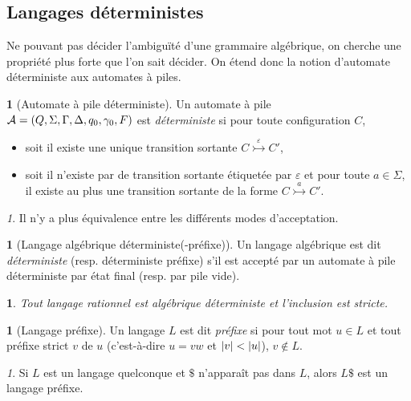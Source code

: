 \documentclass[10pt,a4paper,notitlepage]{article}
\theoremstyle{plain}
\theoremstyle{definition}
\newtheorem{defn}[thm]{\protect\definitionname}
\theoremstyle{definition}
\theoremstyle{remark}
\theoremstyle{remark}
\newtheorem{rem}[thm]{\protect\remarkname}
\theoremstyle{plain}
\theoremstyle{plain}
\newtheorem{prop}[thm]{\protect\propositionname}
\theoremstyle{plain}
\theoremstyle{remark}
\providecommand{\definitionname}{Définition}
\providecommand{\propositionname}{Proposition}
\providecommand{\remarkname}{Remarque}
\begin{document}
\subsection{Langages déterministes} %

Ne pouvant pas décider l'ambiguïté d'une grammaire algébrique, on cherche une propriété plus forte que l'on sait décider. On étend donc la notion d'automate déterministe aux automates à piles.

\begin{defn}[Automate à pile déterministe]
	Un automate à pile \\$\mathcal{A}=(Q,\Sigma, \Gamma, \Delta, q_0, \gamma_0, F)$ est \emph{déterministe} si pour toute configuration $C$,
	\begin{itemize}
		\item soit il existe une unique transition sortante $C\overset{\varepsilon}{\rightarrowtail}C'$,
		\item soit il n'existe par de transition sortante étiquetée par $\varepsilon$ et pour toute $a\in \Sigma$, il existe au plus une transition sortante de la forme $C\overset{a}{\rightarrowtail}C'$.
	\end{itemize}
\end{defn}

\begin{rem}
	Il n'y a plus équivalence entre les différents modes d'acceptation.
\end{rem}

\begin{defn}[Langage algébrique déterministe(-préfixe)] %
	Un langage algébrique est dit \emph{déterministe} (resp. déterministe préfixe) s'il est accepté par un automate à pile déterministe par état final (resp. par pile vide).
\end{defn}

\begin{prop}
	Tout langage rationnel est algébrique déterministe et l'inclusion est stricte.
\end{prop}

\begin{defn}[Langage préfixe]
	Un langage $L$ est dit \emph{préfixe} si pour tout mot $u\in L$ et tout préfixe strict $v$ de $u$ (c'est-à-dire $u=vw$ et $\left|v\right| < \left|u\right|$), $v\not\in L$.
\end{defn}

\begin{rem}
	Si $L$ est un langage quelconque et $\$$ n'apparaît pas dans $L$, alors $L\$$ est un langage préfixe.
\end{rem}
\end{document}
